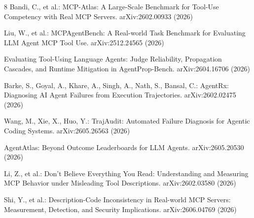 \documentclass[runningheads]{llncs}
\begin{document}
\begin{thebibliography}{8}
\footnotesize
\setlength{\itemsep}{0pt plus 0.3pt}
Bandi, C., et al.: MCP-Atlas: A Large-Scale Benchmark for Tool-Use Competency with Real MCP Servers. arXiv:2602.00933 (2026)

Liu, W., et al.: MCPAgentBench: A Real-world Task Benchmark for Evaluating LLM Agent MCP Tool Use. arXiv:2512.24565 (2026)

Evaluating Tool-Using Language Agents: Judge Reliability, Propagation Cascades, and Runtime Mitigation in AgentProp-Bench. arXiv:2604.16706 (2026)

Barke, S., Goyal, A., Khare, A., Singh, A., Nath, S., Bansal, C.: AgentRx: Diagnosing AI Agent Failures from Execution Trajectories. arXiv:2602.02475 (2026)

Wang, M., Xie, X., Huo, Y.: TrajAudit: Automated Failure Diagnosis for Agentic Coding Systems. arXiv:2605.26563 (2026)

AgentAtlas: Beyond Outcome Leaderboards for LLM Agents. arXiv:2605.20530 (2026)

Li, Z., et al.: Don't Believe Everything You Read: Understanding and Measuring MCP Behavior under Misleading Tool Descriptions. arXiv:2602.03580 (2026)

Shi, Y., et al.: Description-Code Inconsistency in Real-world MCP Servers: Measurement, Detection, and Security Implications. arXiv:2606.04769 (2026)
\end{thebibliography}
\end{document}
